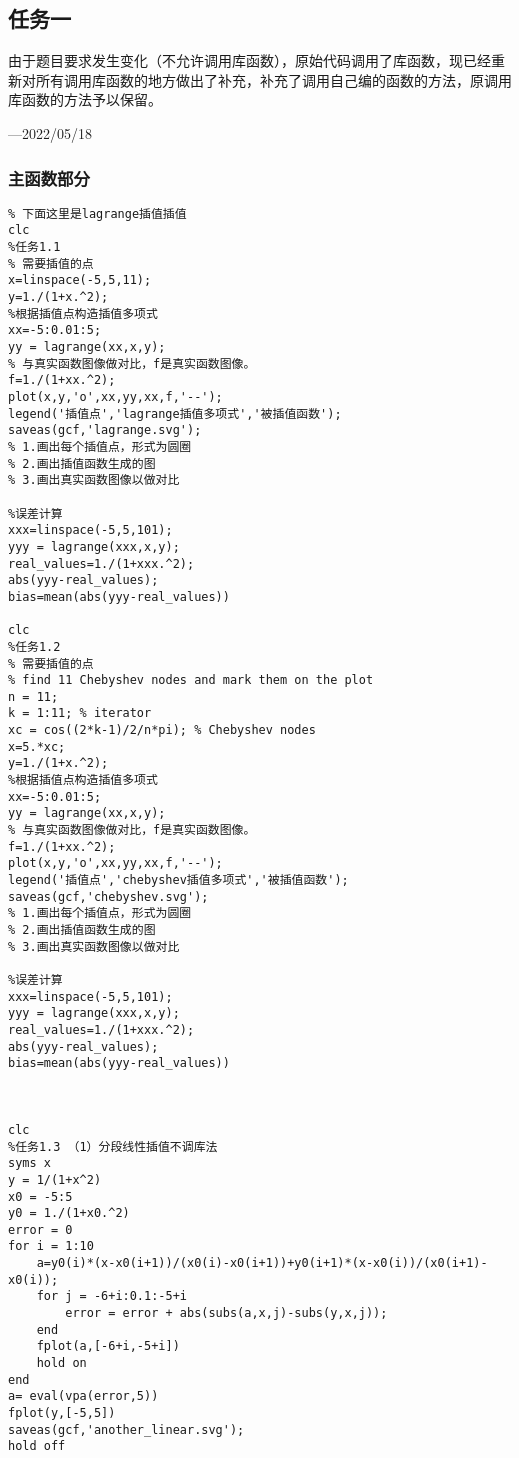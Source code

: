 \documentclass{ctexart}%
\begin{document}
\subsection{任务一}
由于题目要求发生变化（不允许调用库函数），原始代码调用了库函数，现已经重新对所有调用库函数的地方做出了补充，补充了调用自己编的函数的方法，原调用库函数的方法予以保留。    \begin{flushright}---2022/05/18 
\end{flushright}       
\subsubsection{主函数部分}
\begin{lstlisting}
% 下面这里是lagrange插值插值
clc
%任务1.1
% 需要插值的点
x=linspace(-5,5,11);   
y=1./(1+x.^2);
%根据插值点构造插值多项式
xx=-5:0.01:5;
yy = lagrange(xx,x,y);
% 与真实函数图像做对比，f是真实函数图像。
f=1./(1+xx.^2);
plot(x,y,'o',xx,yy,xx,f,'--');
legend('插值点','lagrange插值多项式','被插值函数');
saveas(gcf,'lagrange.svg');
% 1.画出每个插值点，形式为圆圈
% 2.画出插值函数生成的图
% 3.画出真实函数图像以做对比

%误差计算
xxx=linspace(-5,5,101);
yyy = lagrange(xxx,x,y);
real_values=1./(1+xxx.^2);
abs(yyy-real_values);
bias=mean(abs(yyy-real_values))

clc
%任务1.2
% 需要插值的点
% find 11 Chebyshev nodes and mark them on the plot
n = 11;
k = 1:11; % iterator
xc = cos((2*k-1)/2/n*pi); % Chebyshev nodes
x=5.*xc;   
y=1./(1+x.^2);
%根据插值点构造插值多项式
xx=-5:0.01:5;
yy = lagrange(xx,x,y);
% 与真实函数图像做对比，f是真实函数图像。
f=1./(1+xx.^2);
plot(x,y,'o',xx,yy,xx,f,'--');
legend('插值点','chebyshev插值多项式','被插值函数');
saveas(gcf,'chebyshev.svg');
% 1.画出每个插值点，形式为圆圈
% 2.画出插值函数生成的图
% 3.画出真实函数图像以做对比

%误差计算
xxx=linspace(-5,5,101);
yyy = lagrange(xxx,x,y);
real_values=1./(1+xxx.^2);
abs(yyy-real_values);
bias=mean(abs(yyy-real_values))



clc
%任务1.3 （1）分段线性插值不调库法
syms x
y = 1/(1+x^2)
x0 = -5:5
y0 = 1./(1+x0.^2)
error = 0
for i = 1:10
    a=y0(i)*(x-x0(i+1))/(x0(i)-x0(i+1))+y0(i+1)*(x-x0(i))/(x0(i+1)-x0(i));
    for j = -6+i:0.1:-5+i
        error = error + abs(subs(a,x,j)-subs(y,x,j));
    end
    fplot(a,[-6+i,-5+i])
    hold on
end
a= eval(vpa(error,5))
fplot(y,[-5,5])
saveas(gcf,'another_linear.svg');
hold off




\end{lstlisting}
\end{document}
